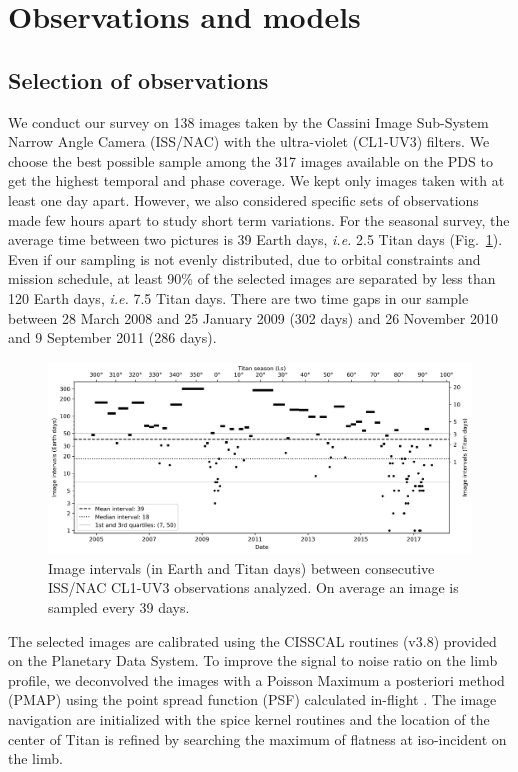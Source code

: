 \section{Observations and models}

\subsection{Selection of observations}
We conduct our survey on 138 images taken by the Cassini Image Sub-System Narrow Angle Camera (ISS/NAC) with the
ultra-violet (CL1-UV3) filters. We choose the best possible sample among the 317 images available on the PDS to get the
highest temporal and phase coverage. We kept only images taken with at least one day apart. However, we also considered
specific sets of observations made few hours apart to study short term variations. For the seasonal survey, the average
time between two pictures is 39 Earth days, \textit{i.e.} 2.5 Titan days (Fig.~\ref{fig:img_sampling}). Even if
our sampling is not evenly distributed, due to orbital constraints and mission schedule, at least 90\% of the selected
images are separated by less than 120 Earth days, \textit{i.e.} 7.5 Titan days. There are two time  gaps in our
sample between 28 March 2008 and 25 January 2009 (302 days) and 26 November 2010 and 9 September 2011 (286 days).

\begin{figure}[!ht]
\centering
\includegraphics[width=\textwidth]{Fig/IMG_interval.png}
\caption{Image intervals (in Earth and Titan days) between consecutive ISS/NAC CL1-UV3 observations analyzed. On average
an image is sampled every 39 days.}
\label{fig:img_sampling}
\end{figure}

The selected images are calibrated using the CISSCAL routines (v3.8) provided on the Planetary Data System. To improve
the signal to noise ratio on the limb profile, we deconvolved the images with a Poisson Maximum a posteriori method
(PMAP) using the point spread function (PSF) calculated in-flight \citep{West2010}. The image navigation are
initialized with the spice kernel routines and the location of the center of Titan is refined by searching the maximum
of flatness at iso-incident on the limb.

